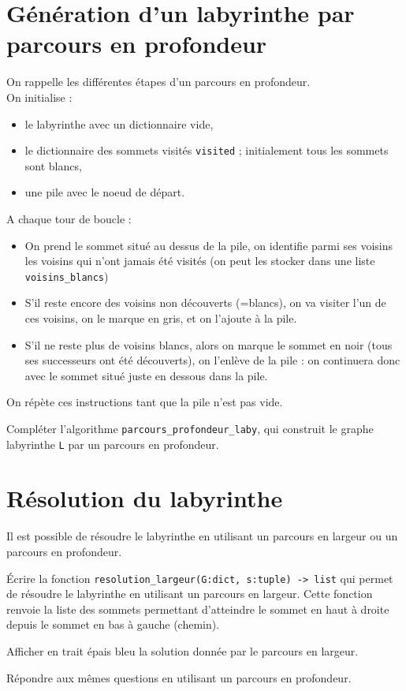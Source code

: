 \section*{Génération d'un labyrinthe par parcours en profondeur}
On rappelle les différentes étapes d'un parcours en profondeur.\\
On initialise :
\begin{itemize}
\item
le labyrinthe avec un dictionnaire vide,
\item
le dictionnaire des sommets visités \texttt{visited} ; initialement tous les sommets sont blancs,
\item 
une pile avec  le noeud de départ.
\end{itemize}
 
A chaque tour de boucle :
\begin{itemize}
\item
On prend le sommet situé au dessus de la pile, on identifie parmi ses voisins les voisins qui n'ont jamais été visités (on peut les stocker dans une liste  \texttt{voisins\_blancs})
\item
S'il reste encore des voisins non découverts (=blancs), on va visiter l'un de ces voisins, on le marque en gris, et on l'ajoute à la pile.
\item S'il ne reste plus de voisins blancs, alors on marque le sommet en noir (tous ses successeurs ont été découverts), on l'enlève de la pile : on continuera donc avec le sommet situé juste en dessous dans la pile.
\end{itemize}

On répète ces instructions tant que la pile n'est pas vide.

\begin{question}
Compléter l'algorithme \texttt{parcours\_profondeur\_laby}, qui construit le graphe labyrinthe \texttt{L} par un parcours en profondeur.
\end{question}

\section*{Résolution du labyrinthe}

Il est possible de résoudre le labyrinthe en utilisant un parcours en largeur ou un parcours en profondeur.

\begin{question} Écrire la fonction \texttt{resolution\_largeur(G:dict, s:tuple) -> list} qui permet de résoudre le labyrinthe en utilisant un parcours en largeur. Cette fonction renvoie la liste des sommets permettant d’atteindre le sommet en haut à droite depuis le sommet en bas à gauche (chemin).
\end{question}

\begin{question}
Afficher en trait épais bleu la solution donnée par le parcours en largeur.
\end{question}

\begin{question}
Répondre aux mêmes questions en utilisant un parcours en profondeur.
\end{question}
